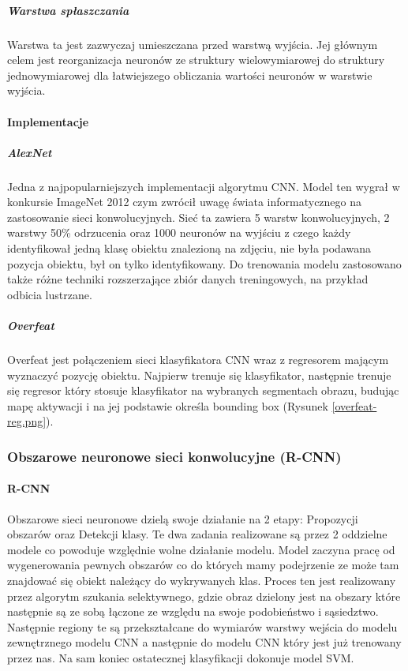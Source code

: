 \subparagraph{Warstwa spłaszczania}
Warstwa ta jest zazwyczaj umieszczana przed warstwą wyjścia. Jej głównym celem jest reorganizacja neuronów ze struktury wielowymiarowej do struktury jednowymiarowej dla łatwiejszego obliczania wartości neuronów w warstwie wyjścia.\cite{CNN-expl}

\paragraph{Implementacje}
\subparagraph{AlexNet}
Jedna z najpopularniejszych implementacji algorytmu CNN. Model ten wygrał w konkursie ImageNet 2012 czym zwrócił uwagę świata informatycznego na zastosowanie sieci konwolucyjnych.
Sieć ta zawiera 5 warstw konwolucyjnych, 2 warstwy 50\% odrzucenia oraz 1000 neuronów na wyjściu z czego każdy identyfikował jedną klasę obiektu znalezioną na zdjęciu, nie była podawana pozycja obiektu, był on tylko identyfikowany. Do trenowania modelu zastosowano także różne techniki rozszerzające zbiór danych treningowych, na przykład odbicia lustrzane. \cite{AlexNet} \cite{ORdum-2}


\subparagraph{Overfeat}
Overfeat jest połączeniem sieci klasyfikatora CNN wraz z regresorem mającym wyznaczyć pozycję obiektu. Najpierw trenuje się klasyfikator, następnie trenuje się regresor który stosuje klasyfikator na wybranych segmentach obrazu, budując mapę aktywacji i na jej podstawie określa bounding box (Rysunek \ref{overfeat-reg.png}). \cite{Overfeat} \cite{ORdum-2}


\subsubsection{Obszarowe neuronowe sieci konwolucyjne (R-CNN)}

\paragraph{R-CNN}
Obszarowe sieci neuronowe dzielą swoje działanie na 2 etapy: Propozycji obszarów oraz Detekcji klasy. Te dwa zadania realizowane są przez 2 oddzielne modele co powoduje względnie wolne działanie modelu. Model zaczyna pracę od wygenerowania pewnych obszarów co do których mamy podejrzenie ze może tam znajdować się obiekt należący do wykrywanych klas. Proces ten jest realizowany przez algorytm szukania selektywnego, gdzie obraz dzielony jest na obszary które następnie są ze sobą łączone ze względu na swoje podobieństwo i sąsiedztwo.\cite{ORdum-1}  Następnie regiony te są przekształcane do wymiarów warstwy wejścia do modelu zewnętrznego modelu CNN a następnie do modelu CNN który jest już trenowany przez nas. Na sam koniec ostatecznej klasyfikacji dokonuje model SVM. \cite{ORdum-3}


